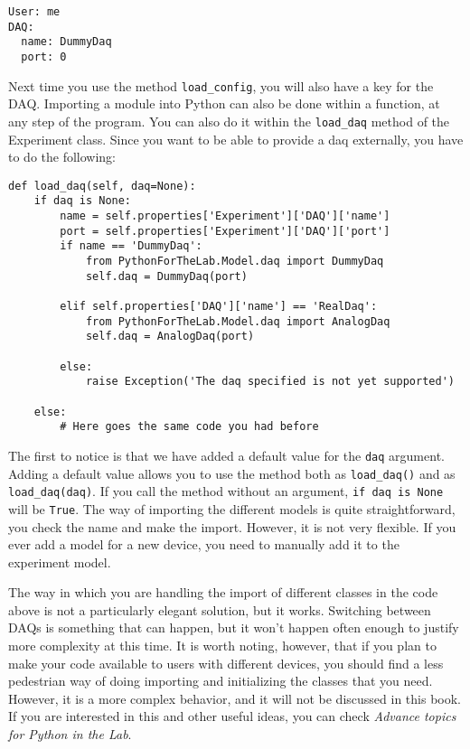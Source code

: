 \begin{verbatim}
User: me
DAQ:
  name: DummyDaq
  port: 0
\end{verbatim}

Next time you use the method \texttt{load_config}, you will also have a
key for the {DAQ}. Importing a module into Python can also be done
within a function, at any step of the program. You can also do it within
the \texttt{load_daq} method of the Experiment class. Since you want to
be able to provide a daq externally, you have to do the following:

\begin{verbatim}
def load_daq(self, daq=None):
    if daq is None:
        name = self.properties['Experiment']['DAQ']['name']
        port = self.properties['Experiment']['DAQ']['port']
        if name == 'DummyDaq':
            from PythonForTheLab.Model.daq import DummyDaq
            self.daq = DummyDaq(port)
        
        elif self.properties['DAQ']['name'] == 'RealDaq':
            from PythonForTheLab.Model.daq import AnalogDaq
            self.daq = AnalogDaq(port)
        
        else:
            raise Exception('The daq specified is not yet supported')
    
    else:
        # Here goes the same code you had before
\end{verbatim}

The first to notice is that we have added a default value for the
\texttt{daq} argument. Adding a default value allows you to use the
method both as \texttt{load_daq()} and as \texttt{load_daq(daq)}. If
you call the method without an argument, \texttt{if daq is None} will
be \texttt{True}. The way of importing the different models is quite
straightforward, you check the name and make the import. However, it is
not very flexible. If you ever add a model for a new device, you need to
manually add it to the experiment model.


The way in which you are handling the import of different classes in the code above is not a particularly elegant solution, but it works.
Switching between DAQs is something that can happen, but it won't happen
often enough to justify more complexity at this time. It is worth
noting, however, that if you plan to make your code available to users
with different devices, you should find a less pedestrian way of doing
importing and initializing the classes that you need. However, it is a
more complex behavior, and it will not be discussed in this book. If you
are interested in this and other useful ideas, you can check
\emph{Advance topics for Python in the Lab}.


